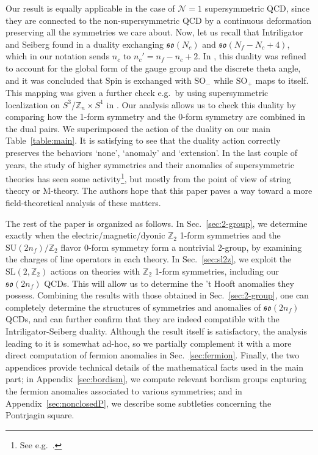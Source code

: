 \documentclass[12pt]{article}
\numberwithin{equation}{section}
\def\Nequals#1{$\mathcal{N}{=}#1$}
\def\bZ{\mathbb{Z}}
\def\SU{\mathrm{SU}}
\def\SO{\mathrm{SO}}
\def\so{\mathfrak{so}}
\def\Spin{\mathrm{Spin}}
\def\SL{\mathrm{SL}}
\begin{document}
Our result is equally applicable in the case of \Nequals1 supersymmetric QCD, 
since they are connected to the non-supersymmetric QCD by a continuous deformation 
preserving all the symmetries we care about.
Now, let us recall that Intriligator and Seiberg found in \cite{Intriligator:1995id} a duality exchanging $\so(N_c)$ and $\so(N_f-N_c+4)$,
which in our notation sends $n_c$ to $n_c'=n_f-n_c+2$.
In \cite{Aharony:2013hda}, this duality was refined to account for the global form of the gauge group and the discrete theta angle, and it was concluded that $\Spin$ is exchanged with $\SO_-$ while $\SO_+$ maps to itself.
This mapping was given a further check e.g.~by using supersymmetric localization on $S^3/\bZ_n \times S^1$ in \cite{Razamat:2013opa}.
Our analysis allows us to check this duality by comparing how the 1-form symmetry and the 0-form symmetry are combined in the dual pairs.
We superimposed the action of the duality on our main Table~\ref{table:main}.
It is satisfying to see that the duality action correctly preserves the behaviors `none', `anomaly' and `extension'.
In the last couple of years, the study of higher symmetries and their anomalies of supersymmetric theories has seen some activity\footnote{%
See e.g.~\cite{Tachikawa:2019dvq,Eckhard:2019jgg,Morrison:2020ool,Albertini:2020mdx,Apruzzi:2020zot,Cvetic:2020kuw,Gukov:2020btk,DelZotto:2020esg,DelZotto:2020sop,Bhardwaj:2020phs,Bhardwaj:2021pfz,Apruzzi:2021vcu,Cvetic:2021sxm,Apruzzi:2021phx,Bhardwaj:2021zrt,Buican:2021xhs,Braun:2021sex,Cvetic:2021maf}.},
but mostly from the point of view of string theory or M-theory.
The authors hope that this paper paves a way toward a more field-theoretical analysis of these matters.

The rest of the paper is organized as follows.
In Sec.~\ref{sec:2-group},
we determine exactly when the electric/magnetic/dyonic $\bZ_2$ 1-form symmetries
and the $\SU(2n_f)/\bZ_2$ flavor 0-form symmetry form a nontrivial 2-group,
by examining the charges of line operators in each theory.
In Sec.~\ref{sec:sl2z},
we exploit the $\SL(2,\bZ_2)$ actions on theories with $\bZ_2$ 1-form symmetries, including our $\so(2n_f)$ QCDs.
This will allow us to determine the 't Hooft anomalies they possess.
Combining the results with those obtained in Sec.~\ref{sec:2-group},
one can completely determine the structures of symmetries and anomalies of $\so(2n_f)$ QCDs,
and can further confirm that they are indeed compatible with the Intriligator-Seiberg duality.
Although the result itself is satisfactory, the analysis leading to it is somewhat ad-hoc, 
so we partially complement it with a more direct computation of fermion anomalies in Sec.~\ref{sec:fermion}.
Finally, the two appendices provide technical details of the mathematical facts used in the main part;
in Appendix~\ref{sec:bordism}, we compute relevant bordism groups capturing the fermion anomalies associated to various symmetries;
and in Appendix~\ref{sec:nonclosedP}, we describe some subtleties concerning the Pontrjagin square.
\end{document}

